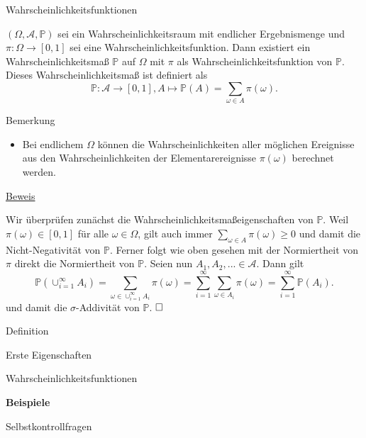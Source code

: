 \documentclass[
  8pt,
  ignorenonframetext,
]{beamer}
\providecommand{\tightlist}{%
  \setlength{\itemsep}{0pt}\setlength{\parskip}{0pt}}
\begin{document}
\begin{frame}{Wahrscheinlichkeitsfunktionen}
\protect\hypertarget{wahrscheinlichkeitsfunktionen-1}{}
\footnotesize
\begin{theorem}
\justifying
\normalfont
$(\Omega, \mathcal{A}, \mathbb{P})$ sei ein Wahrscheinlichkeitsraum mit endlicher
Ergebnismenge und $\pi: \Omega \to [0,1]$ sei eine Wahrscheinlichkeitsfunktion.
Dann existiert ein Wahrscheinlichkeitsmaß $\mathbb{P}$ auf $\Omega$ mit
$\pi$ als Wahrscheinlichkeitsfunktion von $\mathbb{P}$. Dieses Wahrscheinlichkeitsmaß
ist definiert als
\begin{equation}
\mathbb{P} : \mathcal{A} \to [0,1], A \mapsto \mathbb{P}(A) = \sum_{\omega \in A} \pi(\omega).
\end{equation}
\end{theorem}
\footnotesize

Bemerkung

\begin{itemize}
\tightlist
\item
  \justifying Bei endlichem \(\Omega\) können die Wahrscheinlichkeiten
  aller möglichen Ereignisse aus den Wahrscheinlichkeiten der
  Elementarereignisse \(\pi(\omega)\) berechnet werden.
\end{itemize}

\underline{Beweis}

Wir überprüfen zunächst die Wahrscheinlichkeitsmaßeigenschaften von
\(\mathbb{P}\). Weil \(\pi(\omega) \in [0,1]\) für alle
\(\omega \in \Omega\), gilt auch immer
\(\sum_{\omega \in A} \pi(\omega) \ge 0\) und damit die
Nicht-Negativität von \(\mathbb{P}\). Ferner folgt wie oben gesehen mit
der Normiertheit von \(\pi\) direkt die Normiertheit von \(\mathbb{P}\).
Seien nun \(A_1, A_2,... \in \mathcal{A}\). Dann gilt \begin{equation}
\mathbb{P}\left(\cup_{i=1}^\infty A_i \right)
= \sum_{\omega \in \cup_{i=1}^\infty A_i} \pi(\omega)
= \sum_{i = 1}^\infty \sum_{\omega \in A_i} \pi(\omega)
= \sum_{i = 1}^\infty \mathbb{P}(A_i).
\end{equation} und damit die \(\sigma\)-Addivität von \(\mathbb{P}\).
\(\hfill\Box\)
\end{frame}

\begin{frame}{}
\protect\hypertarget{section-9}{}
\large
\vfill

Definition

Erste Eigenschaften

Wahrscheinlichkeitsfunktionen

\textbf{Beispiele}

Selbstkontrollfragen \vfill
\end{frame}
\end{document}
